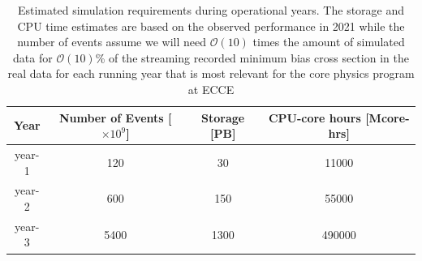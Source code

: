 \begin{table}[ht]
	\centering
	\begin{tabular}{c|c|c|c}
		\hline
		Year & Number of Events [$\times 10^{9}$] & Storage [PB] & CPU-core hours [Mcore-hrs] \\
		\hline
		\hline
		year-1 & 120 & 30 & 11000 \\
		year-2 & 600 & 150 & 55000 \\
		year-3 & 5400 & 1300 & 490000 \\
		\hline
	\end{tabular}
	\caption[]{Estimated simulation requirements during operational years. The storage and CPU time estimates are based on the observed performance in 2021 while the number of events assume we will need 
	$\mathcal{O}(10)$ times the amount of simulated data for $\mathcal{O}(10)$\% of the streaming recorded minimum bias cross section in the real data for each running year that is most relevant for the core physics program at ECCE
	}
	\label{tab:sim_predictions_data_taking}
\end{table}